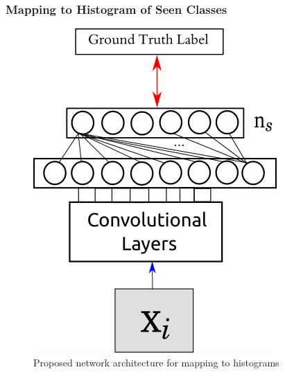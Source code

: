 \documentclass{beamer}
\begin{document}
\begin{frame}\frametitle{Mapping to Histogram of Seen Classes}
  \begin{figure}
  \includegraphics[scale=0.4]{hist_net}
  \caption{Proposed network architecture for mapping to histograms}
  \end{figure}
\end{frame}

\end{document}
